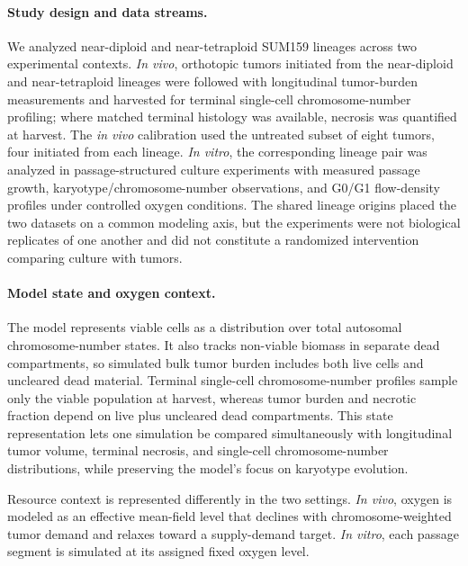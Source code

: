 \documentclass[11pt]{article}
\begin{document}
\paragraph{Study design and data streams.}
We analyzed near-diploid and near-tetraploid SUM159 lineages across two experimental contexts. \textit{In vivo}, orthotopic tumors initiated from the near-diploid and near-tetraploid lineages were followed with longitudinal tumor-burden measurements and harvested for terminal single-cell chromosome-number profiling; where matched terminal histology was available, necrosis was quantified at harvest. The \textit{in vivo} calibration used the untreated subset of eight tumors, four initiated from each lineage. \textit{In vitro}, the corresponding lineage pair was analyzed in passage-structured culture experiments with measured passage growth, karyotype/chromosome-number observations, and G0/G1 flow-density profiles under controlled oxygen conditions. The shared lineage origins placed the two datasets on a common modeling axis, but the experiments were not biological replicates of one another and did not constitute a randomized intervention comparing culture with tumors.

\paragraph{Model state and oxygen context.}
The model represents viable cells as a distribution over total autosomal chromosome-number states. It also tracks non-viable biomass in separate dead compartments, so simulated bulk tumor burden includes both live cells and uncleared dead material. Terminal single-cell chromosome-number profiles sample only the viable population at harvest, whereas tumor burden and necrotic fraction depend on live plus uncleared dead compartments. This state representation lets one simulation be compared simultaneously with longitudinal tumor volume, terminal necrosis, and single-cell chromosome-number distributions, while preserving the model's focus on karyotype evolution.

Resource context is represented differently in the two settings. \textit{In vivo}, oxygen is modeled as an effective mean-field level that declines with chromosome-weighted tumor demand and relaxes toward a supply-demand target. \textit{In vitro}, each passage segment is simulated at its assigned fixed oxygen level.
\end{document}
